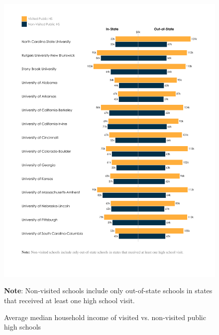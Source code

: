 \documentclass{article}
\begin{document}
\begin{figure}[!htp]
    \centering
    \vspace{-0.5cm}
    \includegraphics[width=\textwidth, trim={1.8cm, 3.6cm, 1.8cm, 1.3cm}, clip]{assets/graphs/income_graph.pdf}
    \begin{flushleft}\textbf{Note}: Non-visited schools include only out-of-state schools in states that received at least one high school visit.\end{flushleft}
    \caption{Average median household income of visited vs. non-visited public high schools}
    \label{fig:income_graph}
\end{figure}
\end{document}
